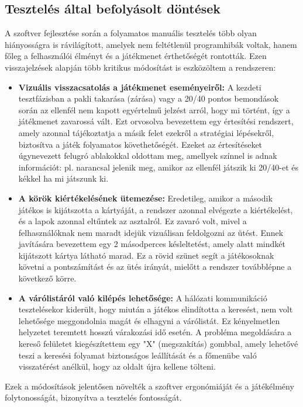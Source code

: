 \subsection{Tesztelés által befolyásolt döntések}
\label{subsec:test_driven_decisions}

A szoftver fejlesztése során a folyamatos manuális tesztelés több olyan hiányosságra is rávilágított, amelyek nem feltétlenül programhibák voltak, hanem főleg a felhasználói élményt és a játékmenet érthetőségét rontották. Ezen visszajelzések alapján több kritikus módosítást is eszközöltem a rendszeren:

\begin{itemize}
    \item \textbf{Vizuális visszacsatolás a játékmenet eseményeiről:} 
    A kezdeti tesztfázisban a pakli takarása (zárása) vagy a 20/40 pontos bemondások során az ellenfél nem kapott egyértelmű jelzést arról, hogy mi történt, így a játékmenet zavarossá vált. Ezt orvosolva bevezettem egy értesítési rendszert, amely azonnal tájékoztatja a másik felet ezekről a stratégiai lépésekről, biztosítva a játék folyamatos követhetőségét. Ezeket az értesítéseket úgynevezett felugró ablakokkal oldottam meg, amellyek színnel is adnak információt: pl. narancsal jelenik meg, amikor az ellenfél játszik ki 20/40-et és kékkel ha mi játszunk ki.

    \item \textbf{A körök kiértékelésének ütemezése:} 
    Eredetileg, amikor a második játékos is kijátszotta a kártyáját, a rendszer azonnal elvégezte a kiértékelést, és a lapok azonnal eltűntek az asztalról. Ez zavaró volt, mivel a felhasználóknak nem maradt idejük vizuálisan feldolgozni az ütést. Ennek javítására bevezettem egy 2 másodperces késleltetést, amely alatt mindkét kijátszott kártya látható marad. Ez a rövid szünet segít a játékosoknak követni a pontszámítást és az ütés irányát, mielőtt a rendszer továbblépne a következő körre.

    \item \textbf{A várólistáról való kilépés lehetősége:} 
    A hálózati kommunikáció tesztelésekor kiderült, hogy miután a játékos elindította a keresést, nem volt lehetősége meggondolnia magát és elhagyni a várólistát. Ez kényelmetlen helyzetet teremtett hosszú várakozási idő esetén. A probléma megoldására a kereső felületet kiegészítettem egy "X" (megszakítás) gombbal, amely lehetővé teszi a keresési folyamat biztonságos leállítását és a főmenübe való visszatérést anélkül, hogy az oldalt újra kellene tölteni.
\end{itemize}

Ezek a módosítások jelentősen növelték a szoftver ergonómiáját és a játékélmény folytonosságát, bizonyítva a tesztelés fontosságát.